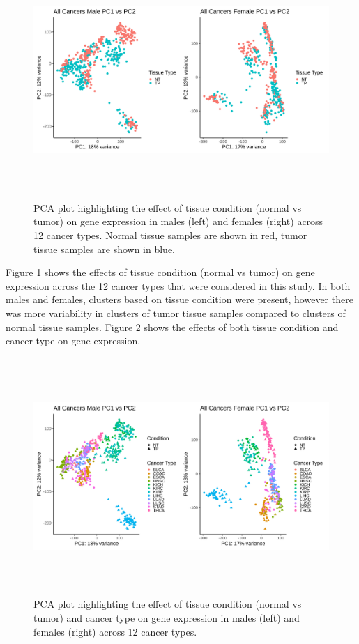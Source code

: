 \documentclass[10pt]{article}
\providecommand{\figref}[1]{Figure \ref{#1}}  %
\begin{document}
	\begin{figure}[!h]
		\centering	
		\includegraphics[width=\textwidth,height=9cm]{all_cancerspca_analysis_condition_0.9.png}
		\caption{PCA plot highlighting the effect of tissue condition (normal vs tumor) on gene expression in males (left) and females (right) across 12 cancer types. Normal tissue samples are shown in red, tumor tissue samples are shown in blue.}
		\label{fig:2}
	\end{figure}

	\figref{fig:2} shows the effects of tissue condition (normal vs tumor) on gene expression across the 12 cancer types that were considered in this study. In both males and females, clusters based on tissue condition were present, however there was more variability in clusters of tumor tissue samples compared to clusters of normal tissue samples. \figref{fig:3} shows the effects of both tissue condition and cancer type on gene expression.
	
	\begin{figure}[!h]
		\centering	
		\includegraphics[width=\textwidth,height=9cm]{all_cancerspca_analysis_condition_cancertype_0.9.png}
		\caption{PCA plot highlighting the effect of tissue condition (normal vs tumor) and cancer type on gene expression in males (left) and females (right) across 12 cancer types.}
		\label{fig:3}
	\end{figure}
	
\end{document}
